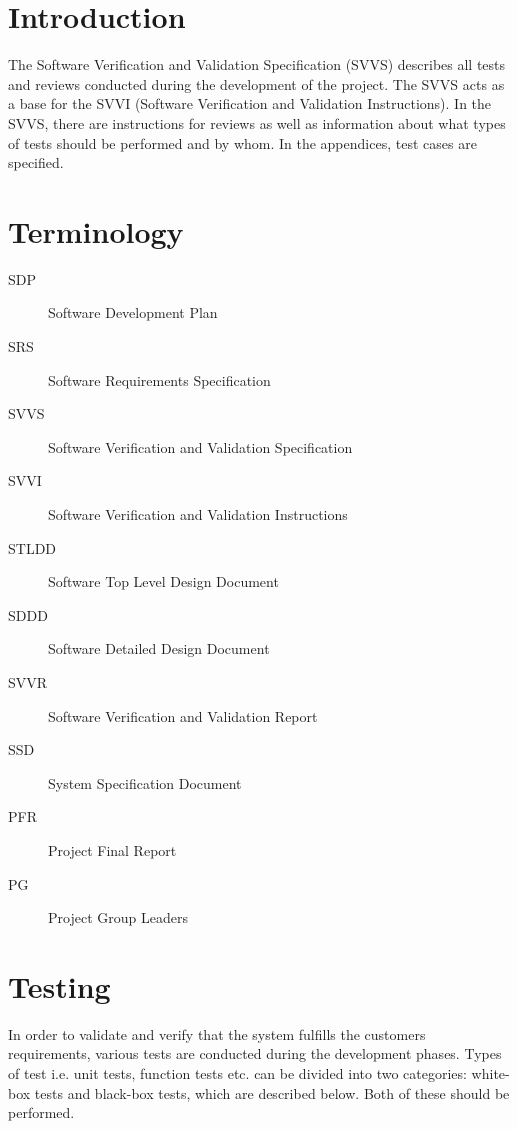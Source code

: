 \documentclass[a4paper]{article}
\begin{document}
\section{Introduction}
The Software Verification and Validation Specification (SVVS) describes all tests and reviews conducted during the development of the project. The SVVS acts as a base for the SVVI (Software Verification and Validation Instructions).
In the SVVS, there are instructions for reviews as well as information about what types of tests should be performed and by whom. In the appendices, test cases are specified.



\section{Terminology}
\begin{description}
\item[SDP] Software Development Plan
\item[SRS] Software Requirements Specification
\item[SVVS] Software Verification and Validation Specification
\item[SVVI] Software Verification and Validation Instructions
\item[STLDD] Software Top Level Design Document
\item[SDDD] Software Detailed Design Document
\item[SVVR] Software Verification and Validation Report
\item[SSD] System Specification Document
\item[PFR] Project Final Report
\item[PG] Project Group Leaders
\end{description}
\section{Testing}
In order to validate and verify that the system fulfills the customers requirements, various tests are conducted during the development phases. Types of test i.e. unit tests, function tests etc. can be divided into two categories: white-box tests and black-box tests, which are described below. Both of these should be performed.  
\end{document}
